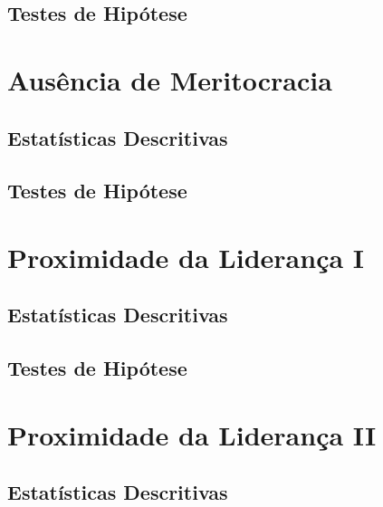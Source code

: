 \documentclass[]{book}
\begin{document}
\hypertarget{testes-de-hipotese-5}{%
\subsection{Testes de Hipótese}\label{testes-de-hipotese-5}}

\hypertarget{ausencia-de-meritocracia-1}{%
\section{Ausência de Meritocracia}\label{ausencia-de-meritocracia-1}}

\hypertarget{estatisticas-descritivas-6}{%
\subsection{Estatísticas Descritivas}\label{estatisticas-descritivas-6}}

\hypertarget{testes-de-hipotese-6}{%
\subsection{Testes de Hipótese}\label{testes-de-hipotese-6}}

\hypertarget{proximidade-da-lideranca-i}{%
\section{Proximidade da Liderança I}\label{proximidade-da-lideranca-i}}

\hypertarget{estatisticas-descritivas-7}{%
\subsection{Estatísticas Descritivas}\label{estatisticas-descritivas-7}}

\hypertarget{testes-de-hipotese-7}{%
\subsection{Testes de Hipótese}\label{testes-de-hipotese-7}}

\hypertarget{proximidade-da-lideranca-ii}{%
\section{Proximidade da Liderança II}\label{proximidade-da-lideranca-ii}}

\hypertarget{estatisticas-descritivas-8}{%
\subsection{Estatísticas Descritivas}\label{estatisticas-descritivas-8}}
\end{document}

